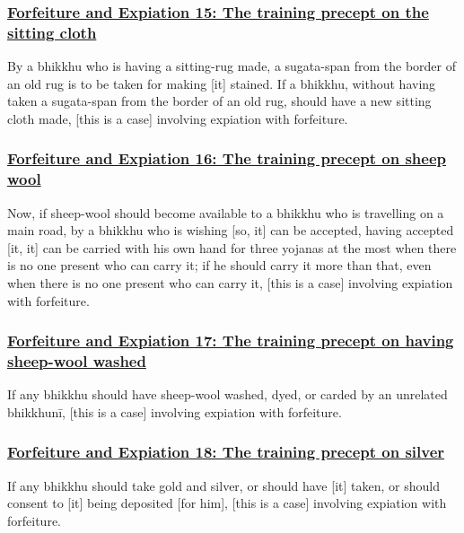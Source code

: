 \subsubsection*{\hyperref[np15]{Forfeiture and Expiation 15: The training precept on the sitting cloth}}
\label{forf-exp15}
By a bhikkhu who is having a sitting-rug made, a sugata-span from the border of an old rug is to be taken for making [it] stained. If a bhikkhu, without having taken a sugata-span from the border of an old rug, should have a new sitting cloth made, [this is a case] involving expiation with forfeiture.

\subsubsection*{\hyperref[np16]{Forfeiture and Expiation 16: The training precept on sheep wool}}
\label{forf-exp16}
Now, if sheep-wool should become available to a bhikkhu who is travelling on a main road, by a bhikkhu who is wishing [so, it] can be accepted, having accepted [it, it] can be carried with his own hand for three yojanas at the most when there is no one present who can carry it; if he should carry it more than that, even when there is no one present who can carry it, [this is a case] involving expiation with forfeiture.

\subsubsection*{\hyperref[np17]{Forfeiture and Expiation 17: The training precept on having sheep-wool washed}}
\label{forf-exp17}
If any bhikkhu should have sheep-wool washed, dyed, or carded by an unrelated bhikkhunī, [this is a case] involving expiation with forfeiture.

\subsubsection*{\hyperref[np18]{Forfeiture and Expiation 18: The training precept on silver}}
\label{forf-exp18}
If any bhikkhu should take gold and silver, or should have [it] taken, or should consent to [it] being deposited [for him], [this is a case] involving expiation with forfeiture.

